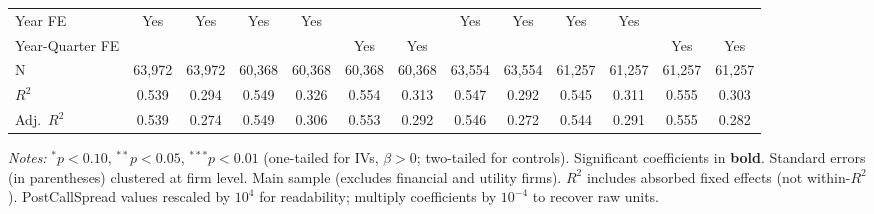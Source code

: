 \documentclass[11pt,a4paper]{article}
\begin{document}
\begin{table}[htbp]
\begin{tabular}{lcccccccccccc}
Year FE & Yes & Yes & Yes & Yes &  &  & Yes & Yes & Yes & Yes &  &  \\
Year-Quarter FE &  &  &  &  & Yes & Yes &  &  &  &  & Yes & Yes \\
\midrule
N & 63,972 & 63,972 & 60,368 & 60,368 & 60,368 & 60,368 & 63,554 & 63,554 & 61,257 & 61,257 & 61,257 & 61,257 \\
$R^2$ & 0.539 & 0.294 & 0.549 & 0.326 & 0.554 & 0.313 & 0.547 & 0.292 & 0.545 & 0.311 & 0.555 & 0.303 \\
Adj.~$R^2$ & 0.539 & 0.274 & 0.549 & 0.306 & 0.553 & 0.292 & 0.546 & 0.272 & 0.544 & 0.291 & 0.555 & 0.282 \\
\bottomrule
\end{tabular}
\begin{minipage}{\linewidth}
\vspace{2pt}\scriptsize
\textit{Notes:} $^{*}p<0.10$, $^{**}p<0.05$, $^{***}p<0.01$ (one-tailed for IVs, $\beta > 0$; two-tailed for controls).
 Significant coefficients in \textbf{bold}.
 Standard errors (in parentheses) clustered at firm level.
 Main sample (excludes financial and utility firms).
 $R^2$ includes absorbed fixed effects (not within-$R^2$).
 PostCallSpread values rescaled by $10^4$ for readability; multiply coefficients by $10^{-4}$ to recover raw units.
\end{minipage}
\end{table}
\clearpage
\end{document}
